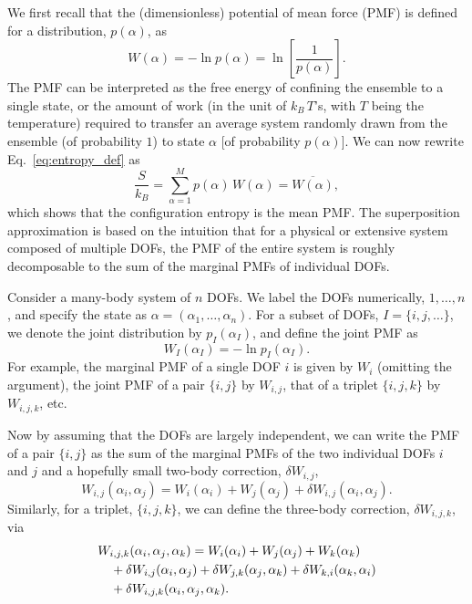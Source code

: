 \documentclass[preprint, superscriptaddress]{revtex4-1}
\begin{document}
We first recall that the (dimensionless) potential of mean force (PMF)
is defined for a distribution, $p(\alpha)$,
as
$$
W(\alpha) = -\ln p(\alpha) = \ln\left[ \frac{1}{p(\alpha)} \right].
$$
The PMF can be interpreted as
the free energy of confining the ensemble to a single state,
or the amount of work
(in the unit of $k_B \, T$'s, with $T$ being the temperature)
required to transfer an average system randomly drawn from the ensemble (of probability $1$)
to state $\alpha$ [of probability $p(\alpha)$].
%
We can now rewrite Eq.~\eqref{eq:entropy_def} as
%
\begin{equation}
  \frac{S}{k_B}
  =
  \sum_{\alpha = 1}^M p(\alpha) \, W(\alpha)
  =
  \overline{ W(\alpha) }
  ,
  \label{eq:S_W}
\end{equation}
%
which shows that the configuration entropy
is the mean PMF.
%
The superposition approximation is based on the intuition
that for a physical or extensive system composed of multiple DOFs,
the PMF of the entire system is roughly decomposable to
the sum of the marginal PMFs of individual DOFs.

Consider a many-body system of $n$ DOFs.
%
We label the DOFs numerically, $1, \dots, n$,
and specify the state as $\alpha = (\alpha_1, \dots, \alpha_n)$.
%
%
For a subset of DOFs, $I = \{i, j, \dots\}$,
we denote the joint distribution by $p_I(\alpha_I)$,
and define the joint PMF as
%
\begin{equation}
  W_I(\alpha_I) = -\ln p_I(\alpha_I)
  .
  \label{eq:WI_def}
\end{equation}
%
For example,
the marginal PMF of a single DOF $i$ is given by $W_i$ (omitting the argument),
the joint PMF of a pair $\{i, j\}$ by $W_{i, j}$,
that of a triplet $\{i, j, k\}$ by $W_{i, j, k}$, etc.

Now by assuming that the DOFs are largely independent,
we can write the PMF of a pair $\{i, j\}$
as the sum of the marginal PMFs of the two individual DOFs $i$ and $j$
and a hopefully small two-body correction, $\delta W_{i,j}$,
%
\begin{equation}
  W_{i,j}(\alpha_i, \alpha_j)
  =
  W_i(\alpha_i) + W_j(\alpha_j)
  + \delta W_{i,j}(\alpha_i, \alpha_j)
  .
  \label{eq:W_ij}
\end{equation}
%
Similarly, for a triplet, $\{i, j, k\}$,
we can define the three-body correction, $\delta W_{i,j,k}$, via
%
\begin{align}
  &W_{i,j,k}(\alpha_i, \alpha_j, \alpha_k)
  =
  W_i(\alpha_i) + W_j(\alpha_j) + W_k(\alpha_k)
  \notag \\
  &\quad
  + \delta W_{i,j}(\alpha_i, \alpha_j)
  + \delta W_{j,k}(\alpha_j, \alpha_k)
  + \delta W_{k,i}(\alpha_k, \alpha_i)
  \notag \\
  &\quad
  + \delta W_{i,j,k}(\alpha_i, \alpha_j, \alpha_k)
  .
  \label{eq:W_ijk}
\end{align}
%
\end{document}
